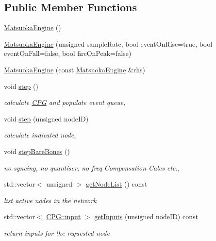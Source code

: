 \subsection*{Public Member Functions}
\begin{DoxyCompactItemize}
\item 
\hyperlink{classMatsuokaEngine_a25f70ceddea44651433ea8547b332ecf}{Matsuoka\+Engine} ()
\item 
\hyperlink{classMatsuokaEngine_a4d26cc1bf5144ea89611377701716fea}{Matsuoka\+Engine} (unsigned sample\+Rate, bool event\+On\+Rise=true, bool event\+On\+Fall=false, bool fire\+On\+Peak=false)
\item 
\hyperlink{classMatsuokaEngine_ab0c8d7fd6eb27c8a8dae7e5fa3742ff9}{Matsuoka\+Engine} (const \hyperlink{classMatsuokaEngine}{Matsuoka\+Engine} \&rhs)
\item 
void \hyperlink{classMatsuokaEngine_a4fa468dc0814f1ad92594f7a4d5abd00}{step} ()
\begin{DoxyCompactList}\small\item\em calculate \hyperlink{classCPG}{C\+PG} and populate event queue, \end{DoxyCompactList}\item 
void \hyperlink{classMatsuokaEngine_aedf2583d11befa98a8a9d74c700635d6}{step} (unsigned node\+ID)
\begin{DoxyCompactList}\small\item\em calculate indicated node, \end{DoxyCompactList}\item 
void \hyperlink{classMatsuokaEngine_a12519e69a1b16fe9c07717ded5249cdf}{step\+Bare\+Bones} ()
\begin{DoxyCompactList}\small\item\em no syncing, no quantiser, no freq Compensation Calcs etc., \end{DoxyCompactList}\item 
std\+::vector$<$ unsigned $>$ \hyperlink{classMatsuokaEngine_a211fdfa8f1f445442a8812cf3f598086}{get\+Node\+List} () const 
\begin{DoxyCompactList}\small\item\em list active nodes in the network \end{DoxyCompactList}\item 
std\+::vector$<$ \hyperlink{structCPG_1_1input}{C\+P\+G\+::input} $>$ \hyperlink{classMatsuokaEngine_a8e159d5e92deacb678ee16229a54c84c}{get\+Inputs} (unsigned node\+ID) const 
\begin{DoxyCompactList}\small\item\em return inputs for the requested node \end{DoxyCompactList}\item 

\end{DoxyCompactItemize}
